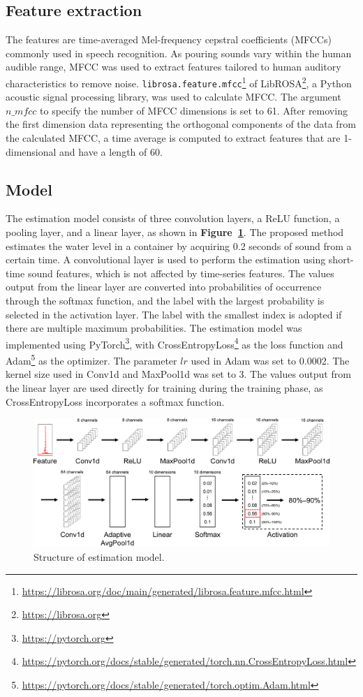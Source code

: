 \documentclass[sigconf]{acmart}
\newcommand\figref[1]{\textbf{Figure~\ref{fig:#1}}}
\begin{document}
\subsection{Feature extraction}
The features are time-averaged Mel-frequency cepstral coefficients (MFCCs) commonly used in speech recognition. As pouring sounds vary within the human audible range, MFCC was used to extract features tailored to human auditory characteristics to remove noise. \texttt{librosa.feature.mfcc}\footnote{\url{https://librosa.org/doc/main/generated/librosa.feature.mfcc.html}} of LibROSA\footnote{\url{https://librosa.org}}, a Python acoustic signal processing library, was used to calculate MFCC. The argument $n\_mfcc$ to specify the number of MFCC dimensions is set to 61. After removing the first dimension data representing the orthogonal components of the data from the calculated MFCC, a time average is computed to extract features that are 1-dimensional and have a length of 60.


\subsection{Model}
The estimation model consists of three convolution layers, a ReLU function, a pooling layer, and a linear layer, as shown in \figref{model}. The proposed method estimates the water level in a container by acquiring 0.2 seconds of sound from a certain time. A convolutional layer is used to perform the estimation using short-time sound features, which is not affected by time-series features. The values output from the linear layer are converted into probabilities of occurrence through the softmax function, and the label with the largest probability is selected in the activation layer. The label with the smallest index is adopted if there are multiple maximum probabilities. The estimation model was implemented using PyTorch\footnote{\url{https://pytorch.org}}, with CrossEntropyLoss\footnote{\url{https://pytorch.org/docs/stable/generated/torch.nn.CrossEntropyLoss.html}} as the loss function and Adam\footnote{\url{https://pytorch.org/docs/stable/generated/torch.optim.Adam.html}} as the optimizer. The parameter $lr$ used in Adam was set to 0.0002. The kernel size used in Conv1d and MaxPool1d was set to 3. The values output from the linear layer are used directly for training during the training phase, as CrossEntropyLoss incorporates a softmax function.

\begin{figure}[!t]
  \centering
  \includegraphics[width=0.9\linewidth]{figures/model.eps}
  \caption{Structure of estimation model.}
  \label{fig:model}
\end{figure}
\end{document}
